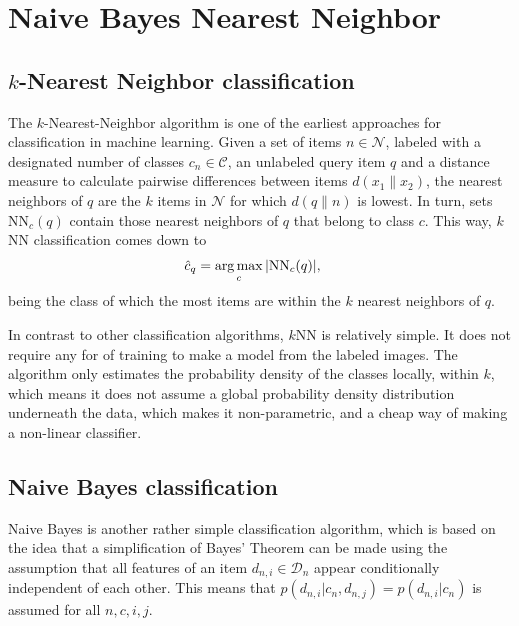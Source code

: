 \chapter{Naive Bayes Nearest Neighbor} %
\label{sec:naive_bayes_nearest_neighbor}


\section{$k$-Nearest Neighbor classification} %
\label{sub:_k_nearest_neighbor}

The $k$-Nearest-Neighbor algorithm is one of the earliest approaches for classification in machine learning. Given a set of items $n \in \mathcal{N}$, labeled with a designated number of classes $c_n \in \mathcal{C}$, an unlabeled query item $q$ and a distance measure to calculate pairwise differences between items $d(x_1\|x_2)$, the nearest neighbors of $q$ are the $k$ items in $\mathcal{N}$ for which $d(q\|n)$ is lowest. In turn, sets $\text{NN}_c(q)$ contain those nearest neighbors of $q$ that belong to class $c$. This way, $k$NN classification comes down to
\begin{align}
    \hat c_q &= \operatorname*{arg\,max}_c |\text{NN}_c(q)|,
\end{align}
being the class of which the most items are within the $k$ nearest neighbors of $q$.

In contrast to other classification algorithms, $k$NN is relatively simple. It does not require any for of training to make a model from the labeled images. The algorithm only estimates the probability density of the classes locally, within $k$, which means it does not assume a global probability density distribution underneath the data, which makes it non-parametric, and a cheap way of making a non-linear classifier.

\section{Naive Bayes classification} %
\label{sub:NB}

Naive Bayes is another rather simple classification algorithm, which is based on the idea that a simplification of Bayes' Theorem can be made using the assumption that all features of an item $d_{n,i} \in \mathcal{D}_n$ appear conditionally independent of each other. This means that $p(d_{n,i} | c_n, d_{n,j}) = p(d_{n,i}|c_n)$ is assumed for all $n,c,i,j$. 

